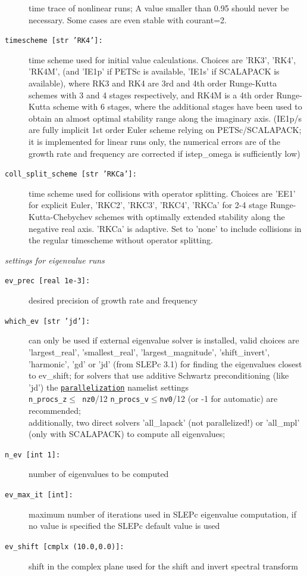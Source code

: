 \documentclass[12pt]{article}
\begin{document}
\begin{description}
  time trace of nonlinear runs; A value smaller than 0.95 should never be necessary. Some cases are even stable with courant=2.
\item[\texttt{timescheme [str 'RK4']:}] time scheme used for initial value calculations. Choices are 
  'RK3', 'RK4', 'RK4M', (and 'IE1p' if PETSc is available, 'IE1s' if SCALAPACK is available), 
  where RK3 and RK4 are 3rd and 4th order Runge-Kutta schemes 
  with 3 and 4 stages respectively, and RK4M is a 4th order Runge-Kutta scheme with 6 stages, where the 
  additional stages have  been used to obtain an almost optimal stability range along the imaginary axis.
  (IE1p/s are fully implicit 1st order Euler scheme relying on PETSc/SCALAPACK; 
  it is implemented for linear runs only, the numerical 
  errors are of the growth rate and frequency are corrected if istep\_omega is sufficiently low)
\item[\texttt{coll\_split\_scheme [str 'RKCa']:}] time scheme used for
  collisions with operator splitting. Choices are 'EE1' for explicit
  Euler, 'RKC2', 'RKC3', 'RKC4', 'RKCa' for 2-4 stage Runge-Kutta-Chebychev schemes with
  optimally extended stability along the negative real axis. 'RKCa' is
  adaptive. Set to 'none' to include collisions in the regular
  timescheme without operator splitting.
\end{description}
%
{\em settings for eigenvalue runs}
\begin{description}
\item[\hypertarget{ev\_prec}{\tt ev\_prec [real 1e-3]:}] 
  desired precision of growth rate and frequency
\item[\texttt{which\_ev [str 'jd']:}] can only be used if external eigenvalue solver is installed, valid choices are
  'largest\_real', 'smallest\_real', 'largest\_magnitude', 
  'shift\_invert', 'harmonic', 'gd' or 'jd' (from SLEPc 3.1) for finding
  the eigenvalues closest to ev\_shift; for solvers that use
  additive Schwartz preconditioning (like 'jd') the
  \hyperlink{parallelization_nml}{{\tt parallelization}} namelist
  settings \\{\tt n\_procs\_z}$\leq${\tt
  nz0}/12 {\tt n\_procs\_v}$\leq${\tt nv0}/12 (or -1 for automatic) are
  recommended;\\
  additionally, two direct solvers 'all\_lapack' (not parallelized!) or 'all\_mpl'
  (only with SCALAPACK) to compute all eigenvalues;
\item[\hypertarget{n_ev}{\texttt{n\_ev [int 1]:}}] number of eigenvalues to be computed
\item[\texttt{ev\_max\_it [int]:}] maximum number of iterations used in SLEPc eigenvalue computation, 
  if no value is specified the SLEPc default value is used
\item[\texttt{ev\_shift [cmplx (10.0,0.0)]:}] shift in the complex plane used for the shift and invert spectral transform
\end{description}
\end{document}
